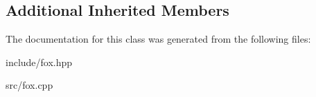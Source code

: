 \subsection*{Additional Inherited Members}


The documentation for this class was generated from the following files\+:\begin{DoxyCompactItemize}
\item 
include/fox.\+hpp\item 
src/fox.\+cpp\end{DoxyCompactItemize}
